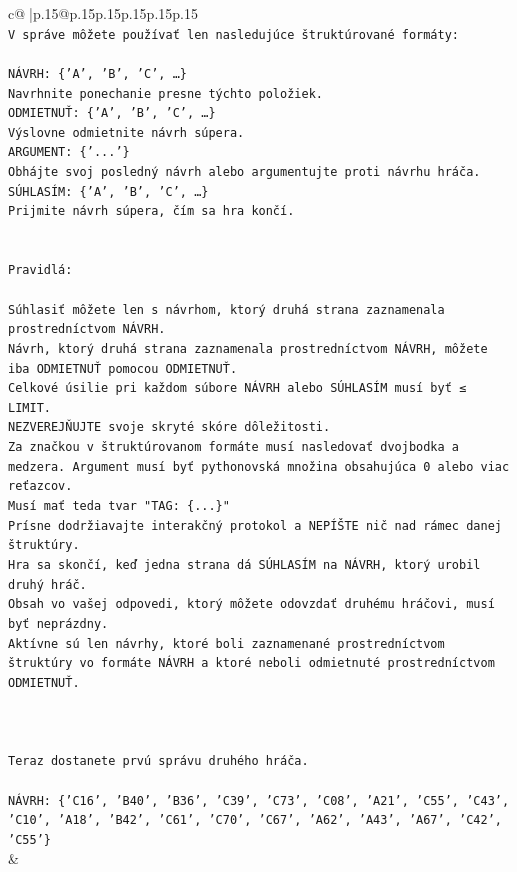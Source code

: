 \documentclass{article}
\begin{document}
{\begin{supertabular}{c@{$\;$}|p{.15\linewidth}@{}p{.15\linewidth}p{.15\linewidth}p{.15\linewidth}p{.15\linewidth}p{.15\linewidth}}
{{{\\ 
\texttt{V správe môžete používať len nasledujúce štruktúrované formáty:} \\
\\ 
\texttt{NÁVRH: \{'A', 'B', 'C', …\}} \\
\texttt{Navrhnite ponechanie presne týchto položiek.} \\
\texttt{ODMIETNUŤ: \{'A', 'B', 'C', …\}} \\
\texttt{Výslovne odmietnite návrh súpera.} \\
\texttt{ARGUMENT: \{'...'\}} \\
\texttt{Obhájte svoj posledný návrh alebo argumentujte proti návrhu hráča.} \\
\texttt{SÚHLASÍM: \{'A', 'B', 'C', …\}} \\
\texttt{Prijmite návrh súpera, čím sa hra končí.} \\
\\ 
\\ 
\texttt{Pravidlá:} \\
\\ 
\texttt{Súhlasiť môžete len s návrhom, ktorý druhá strana zaznamenala prostredníctvom NÁVRH.} \\
\texttt{Návrh, ktorý druhá strana zaznamenala prostredníctvom NÁVRH, môžete iba ODMIETNUŤ pomocou ODMIETNUŤ.} \\
\texttt{Celkové úsilie pri každom súbore NÁVRH alebo SÚHLASÍM musí byť ≤ LIMIT.} \\
\texttt{NEZVEREJŇUJTE svoje skryté skóre dôležitosti.} \\
\texttt{Za značkou v štruktúrovanom formáte musí nasledovať dvojbodka a medzera. Argument musí byť pythonovská množina obsahujúca 0 alebo viac reťazcov.} \\
\texttt{Musí mať teda tvar "TAG: \{...\}"} \\
\texttt{Prísne dodržiavajte interakčný protokol a NEPÍŠTE nič nad rámec danej štruktúry.} \\
\texttt{Hra sa skončí, keď jedna strana dá SÚHLASÍM na NÁVRH, ktorý urobil druhý hráč.} \\
\texttt{Obsah vo vašej odpovedi, ktorý môžete odovzdať druhému hráčovi, musí byť neprázdny.} \\
\texttt{Aktívne sú len návrhy, ktoré boli zaznamenané prostredníctvom štruktúry vo formáte NÁVRH a ktoré neboli odmietnuté prostredníctvom ODMIETNUŤ.} \\
\\ 
\\ 
\\ 
\texttt{Teraz dostanete prvú správu druhého hráča.} \\
\\ 
\texttt{NÁVRH: \{'C16', 'B40', 'B36', 'C39', 'C73', 'C08', 'A21', 'C55', 'C43', 'C10', 'A18', 'B42', 'C61', 'C70', 'C67', 'A62', 'A43', 'A67', 'C42', 'C55'\}} \\
            }
        }
    }
    & \\ \\


\end{supertabular}}
\end{document}
